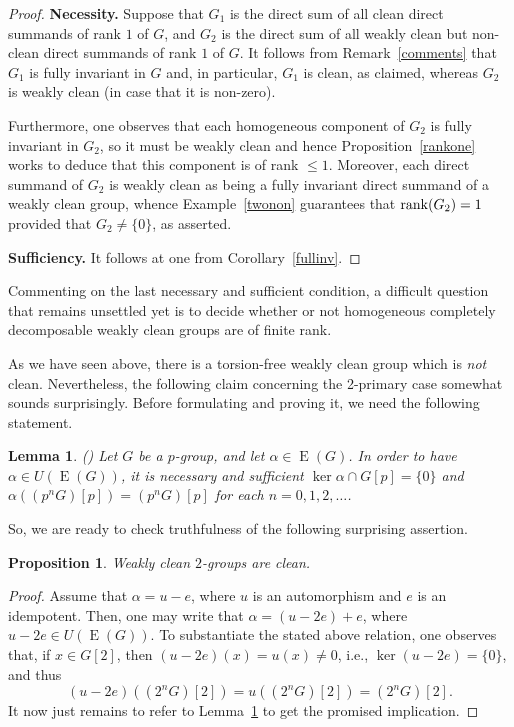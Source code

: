 \documentclass{amsart}
\DeclareMathOperator{\E}{E}
\newtheorem{lemma}[theorem]{Lemma}
\newtheorem{proposition}[theorem]{Proposition}
\theoremstyle{definition}
\theoremstyle{remark}
\numberwithin{equation}{section}
\begin{document}
\begin{proof} {\bf Necessity.} Suppose that $G_1$ is the direct sum of all clean direct summands of rank $1$ of $G$, and $G_2$ is the direct sum of all weakly clean but non-clean direct summands of rank $1$ of $G$. It follows from Remark~\ref{comments} that $G_1$ is fully invariant in $G$ and, in particular, $G_1$ is clean, as claimed, whereas $G_2$ is weakly clean (in case that it is non-zero).

Furthermore, one observes that each homogeneous component of $G_2$ is fully invariant in $G_2$, so it must be weakly clean and hence Proposition~\ref{rankone} works to deduce that this component is of rank $\leq 1$. Moreover, each direct summand of $G_2$ is weakly clean as being a fully invariant direct summand of a weakly clean group, whence Example~\ref{twonon} guarantees that ${\rm rank}(G_2)=1$ provided that $G_2\neq\{0\}$, as asserted.

{\bf Sufficiency.} It follows at one from Corollary~\ref{fullinv}.
\end{proof}

Commenting on the last necessary and sufficient condition, a difficult question that remains unsettled yet is to decide whether or not homogeneous completely decomposable weakly clean groups are of finite rank.

\medskip

As we have seen above, there is a torsion-free weakly clean group which is {\it not} clean. Nevertheless, the following claim concerning the 2-primary case somewhat sounds surprisingly. Before formulating and proving it, we need the following statement.

\begin{lemma}\label{newinstrum} (\cite[Lemma 20.3]{KMT})
Let $G$ be a $p$-group, and let $\alpha\in \E(G)$. In order to have $\alpha\in U(\E(G))$, it is necessary and sufficient $\ker\alpha\cap G[p]=\{0\}$ and $\alpha((p^nG)[p])=(p^nG)[p]$ for each $n=0,1,2,\dots$.
\end{lemma}

So, we are ready to check truthfulness of the following surprising assertion.

\begin{proposition}\label{2-groups}
Weakly clean $2$-groups are clean.
\end{proposition}

\begin{proof} Assume that $\alpha=u-e$, where $u$ is an automorphism and $e$ is an idempotent. Then, one may write that $\alpha=(u-2e)+e$, where $u-2e\in U(\E(G))$. To substantiate the stated above relation, one observes that, if $x\in G[2]$, then $(u-2e)(x)=u(x)\neq 0$, i.e., $\ker(u-2e)=\{0\}$, and thus $$(u-2e)((2^nG)[2])=u((2^nG)[2])=(2^nG)[2].$$ It now just remains to refer to Lemma~\ref{newinstrum} to get the promised implication.
\end{proof}
\end{document}
